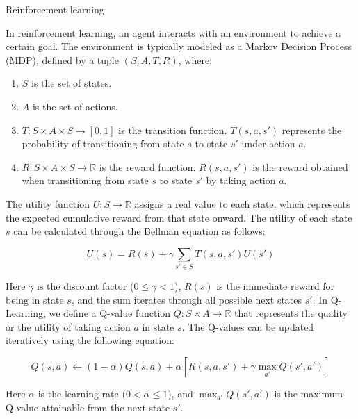 \documentclass{beamer}
\begin{document}
\begin{columns}
\begin{column}{0.3\textwidth}

\begin{block}{Reinforcement learning}

In reinforcement learning, an agent interacts with an environment to achieve a certain goal. The environment is typically modeled as a Markov Decision Process (MDP), defined by a tuple $(S, A, T, R)$, where:

\begin{enumerate}
    \item \( S \) is the set of states.
    \item \( A \) is the set of actions.
    \item \( T: S \times A \times S \rightarrow [0, 1] \) is the transition function. \( T(s, a, s') \) represents the probability of transitioning from state \( s \) to state \( s' \) under action \( a \).
    \item \( R: S \times A \times S \rightarrow \mathbb{R} \) is the reward function. \( R(s, a, s') \) is the reward obtained when transitioning from state \( s \) to state \( s' \) by taking action \( a \).
\end{enumerate}

The utility function \( U: S \rightarrow \mathbb{R} \) assigns a real value to each state, which represents the expected cumulative reward from that state onward. The utility of each state \( s \) can be calculated through the Bellman equation as follows:

\[
U(s) = R(s) + \gamma \sum_{s' \in S} T(s, a, s') U(s')
\]

Here \( \gamma \) is the discount factor (\( 0 \leq \gamma < 1 \)), \( R(s) \) is the immediate reward for being in state \( s \), and the sum iterates through all possible next states \( s' \). In Q-Learning, we define a Q-value function \( Q: S \times A \rightarrow \mathbb{R} \) that represents the quality or the utility of taking action \( a \) in state \( s \). The Q-values can be updated iteratively using the following equation:

\[
Q(s, a) \leftarrow (1 - \alpha) Q(s, a) + \alpha \left[ R(s, a, s') + \gamma \max_{a'} Q(s', a') \right]
\]

Here \( \alpha \) is the learning rate (\( 0 < \alpha \leq 1 \)), and \( \max_{a'} Q(s', a') \) is the maximum Q-value attainable from the next state \( s' \).

\end{block} 


\end{column}
\end{columns}
\end{document}
